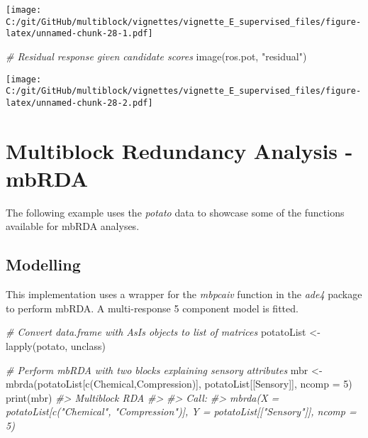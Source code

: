 \documentclass[
]{article}
\newenvironment{Shaded}{\begin{snugshade}}{\end{snugshade}}
\newcommand{\AttributeTok}[1]{\textcolor[rgb]{0.77,0.63,0.00}{#1}}
\newcommand{\CommentTok}[1]{\textcolor[rgb]{0.56,0.35,0.01}{\textit{#1}}}
\newcommand{\DecValTok}[1]{\textcolor[rgb]{0.00,0.00,0.81}{#1}}
\newcommand{\FunctionTok}[1]{\textcolor[rgb]{0.00,0.00,0.00}{#1}}
\newcommand{\NormalTok}[1]{#1}
\newcommand{\OtherTok}[1]{\textcolor[rgb]{0.56,0.35,0.01}{#1}}
\newcommand{\StringTok}[1]{\textcolor[rgb]{0.31,0.60,0.02}{#1}}
\begin{document}
\texttt{[image: C:/git/GitHub/multiblock/vignettes/vignette\_E\_supervised\_files/figure-latex/unnamed-chunk-28-1.pdf]}

\begin{Shaded}
\begin{Highlighting}[]
\CommentTok{\# Residual response given candidate scores}
\FunctionTok{image}\NormalTok{(ros.pot, }\StringTok{"residual"}\NormalTok{)}
\end{Highlighting}
\end{Shaded}

\texttt{[image: C:/git/GitHub/multiblock/vignettes/vignette\_E\_supervised\_files/figure-latex/unnamed-chunk-28-2.pdf]}

\hypertarget{multiblock-redundancy-analysis---mbrda}{%
\section{Multiblock Redundancy Analysis -
mbRDA}\label{multiblock-redundancy-analysis---mbrda}}

The following example uses the \emph{potato} data to showcase some of
the functions available for mbRDA analyses.

\hypertarget{modelling-5}{%
\subsection{Modelling}\label{modelling-5}}

This implementation uses a wrapper for the \emph{mbpcaiv} function in
the \emph{ade4} package to perform mbRDA. A multi-response 5 component
model is fitted.

\begin{Shaded}
\begin{Highlighting}[]
\CommentTok{\# Convert data.frame with AsIs objects to list of matrices}
\NormalTok{potatoList }\OtherTok{\textless{}{-}} \FunctionTok{lapply}\NormalTok{(potato, unclass)}

\CommentTok{\# Perform mbRDA with two blocks explaining sensory attributes}
\NormalTok{mbr }\OtherTok{\textless{}{-}} \FunctionTok{mbrda}\NormalTok{(potatoList[}\FunctionTok{c}\NormalTok{(}\StringTok{\textquotesingle{}Chemical\textquotesingle{}}\NormalTok{,}\StringTok{\textquotesingle{}Compression\textquotesingle{}}\NormalTok{)], potatoList[[}\StringTok{\textquotesingle{}Sensory\textquotesingle{}}\NormalTok{]], }\AttributeTok{ncomp =} \DecValTok{5}\NormalTok{)}
\FunctionTok{print}\NormalTok{(mbr)}
\CommentTok{\#\textgreater{} Multiblock RDA }
\CommentTok{\#\textgreater{} }
\CommentTok{\#\textgreater{} Call:}
\CommentTok{\#\textgreater{} mbrda(X = potatoList[c("Chemical", "Compression")], Y = potatoList[["Sensory"]],     ncomp = 5)}
\end{Highlighting}
\end{Shaded}
\end{document}
